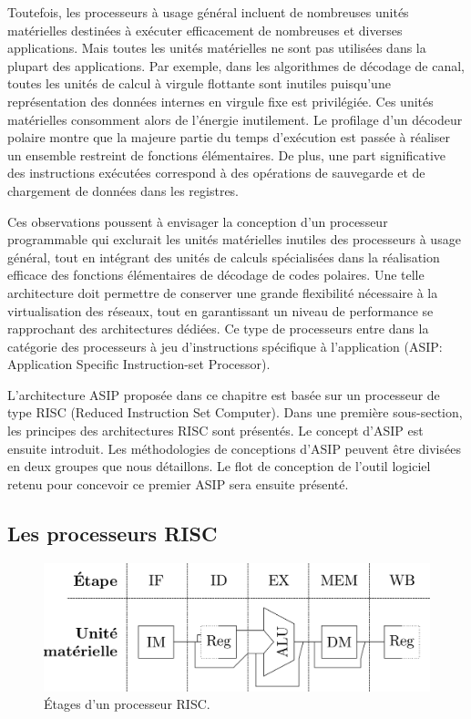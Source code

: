Toutefois, les processeurs à usage général incluent de nombreuses unités matérielles destinées à exécuter efficacement de nombreuses et diverses applications. Mais toutes les unités matérielles ne sont pas utilisées dans la plupart des applications. Par exemple, dans les algorithmes de décodage de canal, toutes les unités de calcul à virgule flottante sont inutiles puisqu'une représentation des données internes en virgule fixe est privilégiée. Ces unités matérielles consomment alors de l'énergie inutilement. Le profilage d'un décodeur polaire montre que la majeure partie du temps d'exécution est passée à réaliser un ensemble restreint de fonctions élémentaires. De plus, une part significative des instructions exécutées correspond à des opérations de sauvegarde et de chargement de données dans les registres.

Ces observations poussent à envisager la conception d'un processeur programmable qui exclurait les unités matérielles inutiles des processeurs à usage général, tout en intégrant des unités de calculs spécialisées dans la réalisation efficace des fonctions élémentaires de décodage de codes polaires. Une telle architecture doit permettre de conserver une grande flexibilité nécessaire à la virtualisation des réseaux, tout en garantissant un niveau de performance se rapprochant des architectures dédiées. Ce type de processeurs entre dans la catégorie des processeurs à jeu d'instructions spécifique à l'application (ASIP: Application Specific Instruction-set Processor).

L'architecture ASIP proposée dans ce chapitre est basée sur un processeur de type RISC (Reduced Instruction Set Computer). Dans une première sous-section, les principes des architectures RISC sont présentés. Le concept d'ASIP est ensuite introduit. Les méthodologies de conceptions d'ASIP peuvent être divisées en deux groupes que nous détaillons. Le flot de conception de l'outil logiciel retenu pour concevoir ce premier ASIP sera ensuite présenté.

\subsection{Les processeurs RISC}
\label{subsec:risc}
\begin{figure}[t]
\centering
\includegraphics[width=\textwidth]{main/ch3_fig/stages}
\caption{\'Etages d'un processeur RISC.}
\label{fig:risc}
\end{figure}

